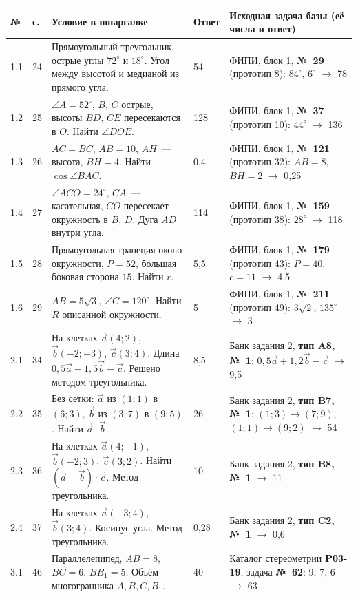\documentclass[fontsize=10pt]{scrartcl}
\begin{document}
\renewcommand{\arraystretch}{1.25}
\begin{longtable}{@{}p{9mm}p{8mm}p{70mm}p{14mm}p{58mm}@{}}
\toprule
\textbf{№} & \textbf{с.} & \textbf{Условие в шпаргалке} & \textbf{Ответ} & \textbf{Исходная задача базы (её числа и ответ)}\\
\midrule\endhead
1.1 & 24 & Прямоугольный треугольник, острые углы $72^\circ$ и $18^\circ$. Угол между высотой и медианой из прямого угла. & 54 & ФИПИ, блок 1, \textbf{№~29} (прототип 8): $84^\circ$, $6^\circ$ $\to$ 78\\
1.2 & 25 & $\angle A=52^\circ$, $B$, $C$ острые, высоты $BD$, $CE$ пересекаются в $O$. Найти $\angle DOE$. & 128 & ФИПИ, блок 1, \textbf{№~37} (прототип 10): $44^\circ$ $\to$ 136\\
1.3 & 26 & $AC=BC$, $AB=10$, $AH$~— высота, $BH=4$. Найти $\cos\angle BAC$. & 0,4 & ФИПИ, блок 1, \textbf{№~121} (прототип 32): $AB=8$, $BH=2$ $\to$ 0,25\\
1.4 & 27 & $\angle ACO=24^\circ$, $CA$~— касательная, $CO$ пересекает окружность в $B$, $D$. Дуга $AD$ внутри угла. & 114 & ФИПИ, блок 1, \textbf{№~159} (прототип 38): $28^\circ$ $\to$ 118\\
1.5 & 28 & Прямоугольная трапеция около окружности, $P=52$, большая боковая сторона $15$. Найти $r$. & 5,5 & ФИПИ, блок 1, \textbf{№~179} (прототип 43): $P=40$, $c=11$ $\to$ 4,5\\
1.6 & 29 & $AB=5\sqrt3$, $\angle C=120^\circ$. Найти $R$ описанной окружности. & 5 & ФИПИ, блок 1, \textbf{№~211} (прототип 49): $3\sqrt2$, $135^\circ$ $\to$ 3\\
\midrule
2.1 & 34 & На клетках $\vec a(4;2)$, $\vec b(-2;-3)$, $\vec c(3;4)$. Длина $0{,}5\vec a+1{,}5\vec b-\vec c$. Решено методом треугольника. & 8,5 & Банк задания 2, \textbf{тип A8, №~1}: $0{,}5\vec a+1{,}2\vec b-\vec c$ $\to$ 9,5\\
2.2 & 35 & Без сетки: $\vec a$ из $(1;1)$ в $(6;3)$, $\vec b$ из $(3;7)$ в $(9;5)$. Найти $\vec a\cdot\vec b$. & 26 & Банк задания 2, \textbf{тип B7, №~1}: $(1;3)\to(7;9)$, $(1;1)\to(9;2)$ $\to$ 54\\
2.3 & 36 & На клетках $\vec a(4;-1)$, $\vec b(-2;3)$, $\vec c(3;2)$. Найти $(\vec a-\vec b)\cdot\vec c$. Метод треугольника. & 10 & Банк задания 2, \textbf{тип B8, №~1} $\to$ 11\\
2.4 & 37 & На клетках $\vec a(-3;4)$, $\vec b(3;4)$. Косинус угла. Метод треугольника. & 0,28 & Банк задания 2, \textbf{тип C2, №~1} $\to$ 0,6\\
\midrule
3.1 & 46 & Параллелепипед, $AB=8$, $BC=6$, $BB_1=5$. Объём многогранника $A,B,C,B_1$. & 40 & Каталог стереометрии \textbf{P03-19}, задача \textbf{№~62}: 9, 7, 6 $\to$ 63\\

\end{longtable}
\end{document}
